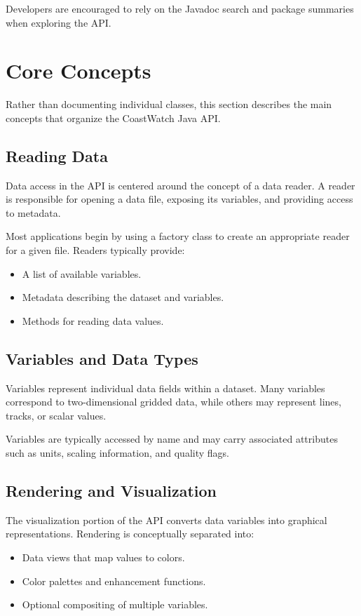Developers are encouraged to rely on the Javadoc search and package
summaries when exploring the API.

\section{Core Concepts}

Rather than documenting individual classes, this section describes the
main concepts that organize the CoastWatch Java API.

\subsection{Reading Data}

Data access in the API is centered around the concept of a data reader.
A reader is responsible for opening a data file, exposing its variables,
and providing access to metadata.

Most applications begin by using a factory class to create an appropriate
reader for a given file. Readers typically provide:
\begin{itemize}
  \item A list of available variables.
  \item Metadata describing the dataset and variables.
  \item Methods for reading data values.
\end{itemize}

\subsection{Variables and Data Types}

Variables represent individual data fields within a dataset. Many
variables correspond to two-dimensional gridded data, while others may
represent lines, tracks, or scalar values.

Variables are typically accessed by name and may carry associated
attributes such as units, scaling information, and quality flags.

\subsection{Rendering and Visualization}

The visualization portion of the API converts data variables into
graphical representations. Rendering is conceptually separated into:
\begin{itemize}
  \item Data views that map values to colors.
  \item Color palettes and enhancement functions.
  \item Optional compositing of multiple variables.
\end{itemize}

